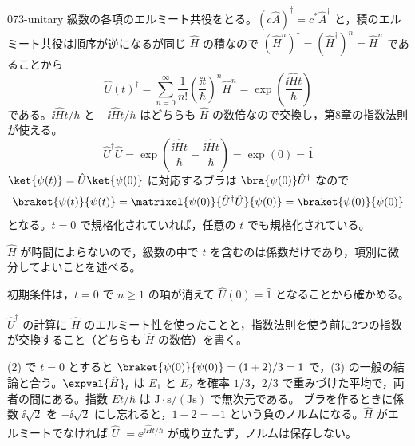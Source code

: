 \documentclass[uplatex,dvipdfmx,a4paper,11pt]{jsarticle}
\begin{document}
\begin{kaisetsu}{073-unitary}
 級数の各項のエルミート共役をとる。$(c\hat{A})^{\dagger}=c^{*}\hat{A}^{\dagger}$ と，積のエルミート共役は順序が逆になるが同じ $\hat{H}$ の積なので $(\hat{H}^{n})^{\dagger}=(\hat{H}^{\dagger})^{n}=\hat{H}^{n}$ であることから
\[ \hat{U}(t)^{\dagger}=\sum_{n=0}^{\infty}\frac{1}{n!}\left(\frac{\ii t}{\hbar}\right)^{n}\hat{H}^{n}=\exp\left(\frac{\ii\hat{H}t}{\hbar}\right) \]
である。$\ii\hat{H}t/\hbar$ と $-\ii\hat{H}t/\hbar$ はどちらも $\hat{H}$ の数倍なので交換し，第8章の指数法則が使える。
\[ \hat{U}^{\dagger}\hat{U}=\exp\left(\frac{\ii\hat{H}t}{\hbar}-\frac{\ii\hat{H}t}{\hbar}\right)=\exp(0)=\hat{1} \]
$\ket{\psi(t)}=\hat{U}\ket{\psi(0)}$ に対応するブラは $\bra{\psi(0)}\hat{U}^{\dagger}$ なので
\[ \braket{\psi(t)}{\psi(t)}=\matrixel{\psi(0)}{\hat{U}^{\dagger}\hat{U}}{\psi(0)}=\braket{\psi(0)}{\psi(0)} \]
となる。$t=0$ で規格化されていれば，任意の $t$ でも規格化されている。
\begin{ronten}
  \item {} $\hat{H}$ が時間によらないので，級数の中で $t$ を含むのは係数だけであり，項別に微分してよいことを述べる。
  \item {} 初期条件は，$t=0$ で $n\ge1$ の項が消えて $\hat{U}(0)=\hat{1}$ となることから確かめる。
  \item {} $\hat{U}^{\dagger}$ の計算に $\hat{H}$ のエルミート性を使ったことと，指数法則を使う前に2つの指数が交換すること（どちらも $\hat{H}$ の数倍）を書く。
\end{ronten}
\kenzan (2) で $t=0$ とすると $\braket{\psi(0)}{\psi(0)}=(1+2)/3=1$ で，(3) の一般の結論と合う。$\expval{\hat{H}}_{t}$ は $E_{1}$ と $E_{2}$ を確率 $1/3$，$2/3$ で重みづけた平均で，両者の間にある。指数 $Et/\hbar$ は $\unit{\joule}\cdot\unit{\second}/(\unit{\joule\second})$ で無次元である。
\tsumazuki ブラを作るときに係数 $\ii\sqrt{2}$ を $-\ii\sqrt{2}$ にし忘れると，$1-2=-1$ という負のノルムになる。$\hat{H}$ がエルミートでなければ $\hat{U}^{\dagger}=\ee^{\ii\hat{H}t/\hbar}$ が成り立たず，ノルムは保存しない。
\end{kaisetsu}
\end{document}
